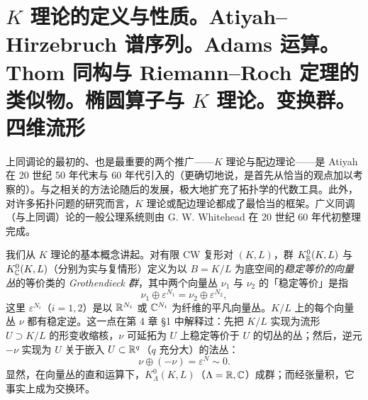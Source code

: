 \section[K 理论。 Atiyah--Hirzebruch 谱序列。 椭圆算子与 K 理论]{$K$ 理论的定义与性质。Atiyah--Hirzebruch 谱序列。Adams 运算。Thom 同构与 Riemann--Roch 定理的类似物。椭圆算子与 $K$ 理论。变换群。四维流形}


上同调论的最初的、也是最重要的两个推广——$K$ 理论与配边理论——是 Atiyah 在 20 世纪 50 年代末与 60 年代引入的（更确切地说，是首先从恰当的观点加以考察的）。与之相关的方法论随后的发展，极大地扩充了拓扑学的代数工具。此外，对许多拓扑问题的研究而言，$K$ 理论或配边理论都成了最恰当的框架。广义同调（与上同调）论的一般公理系统则由 G. W. Whitehead 在 20 世纪 60 年代初整理完成。

我们从 $K$ 理论的基本概念讲起。对有限 CW 复形对 $(K,L)$，群 $K_{\mathbb{R}}^0(K,L)$ 与 $K_{\mathbb{C}}^0(K,L)$（分别为实与复情形）定义为以 $B=K/L$ 为底空间的\emph{稳定等价的向量丛}的等价类的 \emph{Grothendieck 群}，其中两个向量丛 $\nu_1$ 与 $\nu_2$ 的「稳定等价」是指
\begin{equation}
\nu_1\oplus\varepsilon^{N_1}=\nu_2\oplus\varepsilon^{N_2}, \tag{8.1}
\end{equation}
这里 $\varepsilon^{N_i}$（$i=1,2$）是以 $\mathbb{R}^{N_i}$ 或 $\mathbb{C}^{N_i}$ 为纤维的平凡向量丛。$K/L$ 上的每个向量丛 $\nu$ 都有稳定逆。这一点在第 4 章 §1 中解释过：先把 $K/L$ 实现为流形 $U\supset K/L$ 的形变收缩核，$\nu$ 可延拓为 $U$ 上稳定等价于 $U$ 的切丛的丛；然后，逆元 $-\nu$ 实现为 $U$ 关于嵌入 $U\subset\mathbb{R}^q$（$q$ 充分大）的法丛：
\begin{equation}
\nu\oplus(-\nu)=\varepsilon^N\sim0. \tag{8.2}
\end{equation}
显然，在向量丛的直和运算下，$K_\Lambda^0(K,L)$（$\Lambda=\mathbb{R},\mathbb{C}$）成群；而经张量积，它事实上成为交换环。

